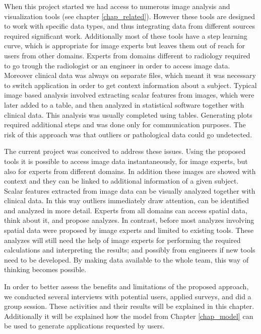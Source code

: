 

When this project started we had access to numerous image analysis and visualization tools (see chapter \ref{chap_related}). However these tools are designed to work with specific data types, and thus integrating data from different sources required significant work. Additionally most of these tools have a step learning curve, which is appropriate for image experts but leaves them out of reach for users from other domains. Experts from domains different to radiology required to go trough the radiologist or an engineer in order to access image data. Moreover clinical data was always on separate files, which meant it was necessary to switch application in order to get context information about a subject. Typical image based analysis involved extracting scalar features from images, which were later added to a table, and then analyzed in statistical software together with clinical data. This analysis was usually completed using tables. Generating plots required additional steps and was done only for communication purposes. The risk of this approach was that outliers or pathological data could go undetected. 

The current project was conceived to address these issues. Using the proposed tools it is possible to access image data instantaneously,  for image experts, but also for experts from different domains. In addition these images are showed with context and they can be linked to additional information of a given subject. Scalar features extracted from image data can be visually analyzed together with clinical data. In this way outliers immediately draw attention, can be identified and analyzed in more detail. Experts from all domains can access spatial data, think about it, and propose analyzes. In contrast, before most analyzes involving spatial data were proposed by image experts and limited to existing tools. These analyzes will still need the help of image experts for performing the required calculations and interpreting the results; and possibly from engineers if new tools need to be developed. By making data available to the whole team, this way of thinking becomes possible.    

In order to better assess the benefits and limitations of the proposed approach, we conducted several interviews with potential users, applied surveys, and did a group session. These activities and their results will be explained in this chapter. Additionally it will be explained how the model from Chapter \ref{chap_model} can be used to generate applications requested by users.	

